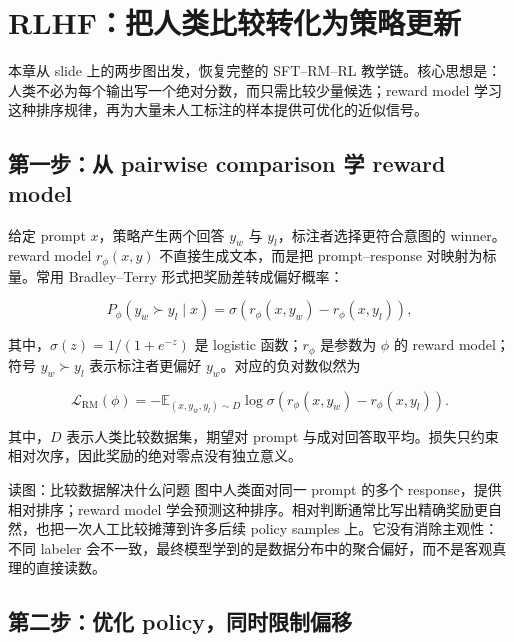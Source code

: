 \section{RLHF：把人类比较转化为策略更新}

本章从 slide 上的两步图出发，恢复完整的 SFT--RM--RL 教学链。核心思想是：人类不必为每个输出写一个绝对分数，而只需比较少量候选；reward model 学习这种排序规律，再为大量未人工标注的样本提供可优化的近似信号。

\subsection{第一步：从 pairwise comparison 学 reward model}

给定 prompt $x$，策略产生两个回答 $y_w$ 与 $y_l$，标注者选择更符合意图的 winner。reward model $r_\phi(x,y)$ 不直接生成文本，而是把 prompt--response 对映射为标量。常用 Bradley--Terry 形式把奖励差转成偏好概率：

\[
P_\phi(y_w \succ y_l\mid x)
=\sigma\!\left(r_\phi(x,y_w)-r_\phi(x,y_l)\right),
\]

其中，$\sigma(z)=1/(1+e^{-z})$ 是 logistic 函数；$r_\phi$ 是参数为 $\phi$ 的 reward model；符号 $y_w \succ y_l$ 表示标注者更偏好 $y_w$。对应的负对数似然为

\[
\mathcal{L}_{\mathrm{RM}}(\phi)
=-\mathbb{E}_{(x,y_w,y_l)\sim D}
\log \sigma\!\left(r_\phi(x,y_w)-r_\phi(x,y_l)\right).
\]

其中，$D$ 表示人类比较数据集，期望对 prompt 与成对回答取平均。损失只约束相对次序，因此奖励的绝对零点没有独立意义。


\begin{knowledgebox}{读图：比较数据解决什么问题}
图中人类面对同一 prompt 的多个 response，提供相对排序；reward model 学会预测这种排序。相对判断通常比写出精确奖励更自然，也把一次人工比较摊薄到许多后续 policy samples 上。它没有消除主观性：不同 labeler 会不一致，最终模型学到的是数据分布中的聚合偏好，而不是客观真理的直接读数。
\end{knowledgebox}


\subsection{第二步：优化 policy，同时限制偏移}

